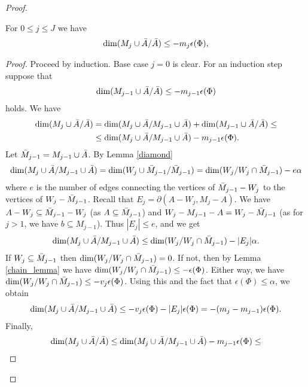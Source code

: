\documentclass{amsart}
\begin{document}
\begin{proof}
  \begin{Lemma} \label{ubdim_lemma}
    For $0 \leq j \leq J$ we have
    \begin{align*}
      \dim(M_j \cup \bar A / \bar A) \leq -m_j  \epsilon(\Phi),
    \end{align*}
  \end{Lemma}
  \begin{proof}
    Proceed by induction. Base case $j = 0$ is clear.    
    For an induction step suppose that
    \begin{align*}
      \dim(M_{j-1} \cup \bar A / \bar A) \leq  - m_{j-1}  \epsilon(\Phi)
    \end{align*}
    holds.
    We have
    \begin{align*}
      \dim(M_j \cup \bar A / \bar A) &= \dim(M_j \cup \bar A / M_{j-1} \cup \bar A) + \dim(M_{j-1} \cup \bar A / \bar A) \leq \\
      &\leq \dim(M_j \cup \bar A / M_{j-1} \cup \bar A) - m_{j-1}  \epsilon(\Phi).
    \end{align*}
    Let $\bar M_{j-1} = M_{j-1} \cup \bar A$.
    By Lemma \ref{diamond}
    \begin{align*}
      \dim(M_j \cup \bar A / M_{j-1} \cup \bar A) = \dim(W_j \cup \bar M_{j-1} / \bar M_{j-1}) = \dim(W_j / W_j \cap \bar M_{j-1}) - e \alpha
    \end{align*}
    where $e$ is the number of edges connecting the vertices of $\bar M_{j-1} - W_j$ to the vertices of $W_j - \bar M_{j-1}$.
    Recall that       $E_j = \partial(A - W_j, M_j - A)$.
    We have $A - W_j \subseteq \bar M_{j-1} - W_j$ (as $A \subseteq \bar M_{j-1}$) and $W_j - M_{j-1} - A = W_j - \bar M_{j-1}$ (as for $j > 1$, we have $b \subseteq M_{j-1}$).
    Thus $|E_j| \leq e$, and we get 
    \begin{align*}
      \dim(M_j \cup \bar A / M_{j-1} \cup \bar A) \leq \dim(W_j / W_j \cap \bar M_{j-1}) - |E_j| \alpha.
    \end{align*}
    If $W_j \subseteq \bar M_{j-1}$ then $\dim(W_j / W_j \cap \bar M_{j-1}) = 0$.
    If not, then by Lemma \ref{chain_lemma} we have $\dim(W_j / W_j \cap \bar M_{j-1}) \leq - \epsilon(\Phi)$.
    Either way, we have $\dim(W_j / W_j \cap \bar M_{j-1}) \leq - v_j \epsilon(\Phi)$.
    Using this and the fact that $\epsilon(\Phi) \leq \alpha$, we obtain
    \begin{align*}
      \dim(M_j \cup \bar A / M_{j-1} \cup \bar A) \leq - v_j \epsilon(\Phi) - |E_j| \epsilon(\Phi) = -(m_j - m_{j-1})\epsilon(\Phi).
    \end{align*}
    Finally,
    \begin{align*}
      \dim(M_j \cup \BA / \BA) &\leq \dim(M_j \cup \BA / M_{j-1} \cup \BA) - m_{j-1}  \epsilon(\Phi) \leq \\

\end{align*}
\end{proof}
\end{proof}
\end{document}
